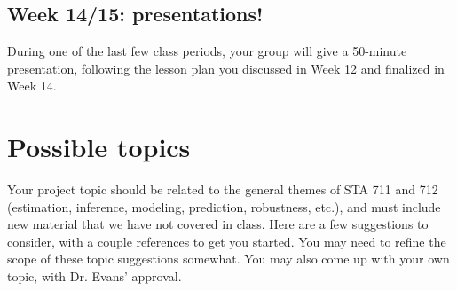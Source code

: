 \documentclass[11pt]{article}
\begin{document}
\vspace*{0.5cm}

\subsection*{Week 14/15: presentations!}

During one of the last few class periods, your group will give a 50-minute presentation, following the lesson plan you discussed in Week 12 and finalized in Week 14. 

\newpage

\section*{Possible topics}

Your project topic should be related to the general themes of STA 711 and 712 (estimation, inference, modeling, prediction, robustness, etc.), and must include new material that we have not covered in class. Here are a few suggestions to consider, with a couple references to get you started. You may need to refine the scope of these topic suggestions somewhat. You may also come up with your own topic, with Dr. Evans' approval. 
\end{document}
